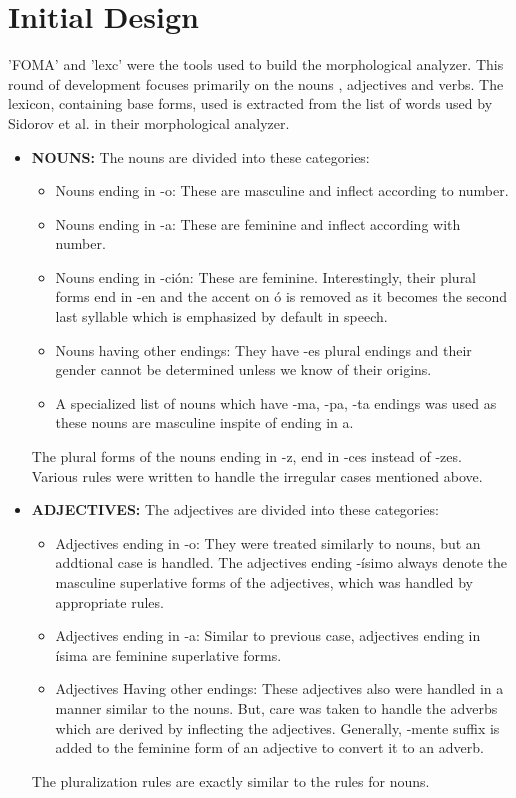 \documentclass[11pt,letterpaper]{article}
\begin{document}
\section{Initial Design}
'FOMA' and 'lexc' were the tools used to build the morphological analyzer. 
This round of development focuses primarily on the nouns , adjectives and verbs. The lexicon, containing base forms, used is extracted from the list of words used by Sidorov et al. in their morphological analyzer. 
\begin{itemize}
\item
{\bf NOUNS:} The nouns are divided into these categories:
\begin{itemize}
\item Nouns ending in -o: These are masculine and inflect according to number. 
\item Nouns ending in -a: These are feminine and inflect according with number.
\item Nouns ending in -ción: These are feminine. Interestingly, their plural forms end in -en and the accent on ó is removed as it becomes the second last syllable which is emphasized by default in speech.
\item Nouns having other endings: They have -es plural endings and their gender cannot be determined unless we know of their origins.
\item A specialized list of nouns which have -ma, -pa, -ta endings was used as these nouns are masculine inspite of ending in a.
\end{itemize}
The plural forms of the nouns ending in -z, end in -ces instead of -zes.
Various rules were written to handle the irregular cases mentioned above.

\item
{\bf ADJECTIVES:} The adjectives are divided into these categories:
\begin{itemize}
\item Adjectives ending in -o: They were treated similarly to nouns, but an addtional case is handled. The adjectives ending -ísimo always denote the masculine superlative forms of the adjectives, which was handled by appropriate rules.
\item Adjectives ending in -a: Similar to previous case, adjectives ending in ísima are feminine superlative forms.
\item Adjectives Having other endings: These adjectives also were handled in a manner similar to the nouns. But, care was taken to handle the adverbs which are derived by inflecting the adjectives. Generally, -mente suffix is added to the feminine form of an adjective to convert it to an adverb.
\end{itemize}
The pluralization rules are exactly similar to the rules for nouns.


\end{itemize}
\end{document}

